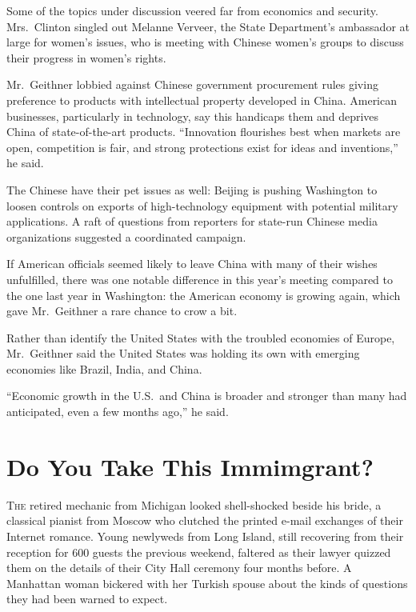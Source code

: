 ﻿\documentclass[12pt]{article}
\begin{document}
Some of the topics under discussion veered far from economics and security. Mrs.~Clinton singled out
Melanne Verveer, the State Department's ambassador at large for women's issues, who is meeting with
Chinese women's groups to discuss their progress in women's rights.

Mr.~Geithner lobbied against Chinese government procurement rules giving preference to products with
intellectual property developed in China. American businesses, particularly in technology, say this
handicaps them and deprives China of state-of-the-art products. ``Innovation flourishes best when
markets are open, competition is fair, and strong protections exist for ideas and inventions,'' he
said.

The Chinese have their pet issues as well: Beijing is pushing Washington to loosen controls on
exports of high-technology equipment with potential military applications. A raft of questions from
reporters for state-run Chinese media organizations suggested a coordinated campaign.

If American officials seemed likely to leave China with many of their wishes unfulfilled, there was
one notable difference in this year's meeting compared to the one last year in Washington: the
American economy is growing again, which gave Mr.~Geithner a rare chance to crow a bit.

Rather than identify the United States with the troubled economies of Europe, Mr.~Geithner said the
United States was holding its own with emerging economies like Brazil, India, and China.

``Economic growth in the U.S.~and China is broader and stronger than many had anticipated, even a
few months ago,'' he said.

\section{Do You Take This Immimgrant?}

\lettrine{T}{he} retired mechanic from Michigan looked shell-shocked beside
his bride, a classical pianist from Moscow who clutched the printed e-mail exchanges of their
Internet romance. Young newlyweds from Long Island, still recovering from their reception for 600
guests the previous weekend, faltered as their lawyer quizzed them on the details of their City Hall
ceremony four months before. A Manhattan woman bickered with her Turkish spouse about the kinds of
questions they had been warned to expect.
\end{document}
